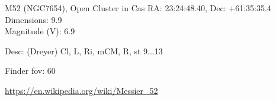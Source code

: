 \begin{block}{M52 (NGC7654), Open Cluster in Cas}
    RA: 23:24:48.40, Dec: +61:35:35.4 \\ 
    Dimensions: 9.9 \\ 
    Magnitude (V): 6.9


    Desc: (Dreyer) Cl, L, Ri, mCM, R, st 9...13 

    Finder fov: 60 

    \url{https://en.wikipedia.org/wiki/Messier_52} 
\end{block}